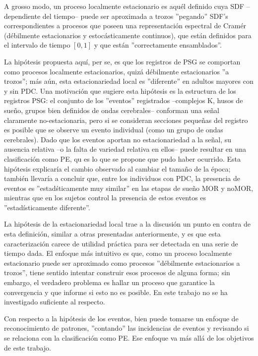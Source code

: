 A grosso modo, un proceso localmente estacionario 
es aqu\'el definido cuya SDF --dependiente del tiempo--
puede ser aproximada a trozos ''pegando'' SDF's correspondientes a procesos que poseen una
representaci\'on espectral de Cram\'er
(d\'ebilmente estacionarios y estoc\'asticamente continuos), que est\'an definidos
para el intervalo de tiempo $[0,1]$ y que est\'an ''correctamente ensamblados''.

La hip\'otesis propuesta aqu\'i, per se, es que los registros de PSG se comportan como procesos
localmente estacionarios, quiz\'a d\'ebilmente estacionarios ''a trozos''; 
m\'as a\'un, esta estacionariedad local es ''diferente'' en
adultos mayores con y sin PDC. 
Una motivaci\'on que sugiere esta hip\'otesis es la estructura de los registros PSG: 
el conjunto de los ''eventos'' registrados
--complejos K, husos de sue\~no, grupos bien definidos de ondas cerebrales--
conforman una se\~nal claramente no-estacionaria, pero si se consideran secciones peque\~nas
del registro es posible que se observe un evento individual (como un grupo de ondas cerebrales).
Dado que los eventos aportan no estacionariedad a la se\~nal, su ausencia relativa --o la falta
de variedad relativa en ellos-- puede resultar en una clasificaci\'on como PE, qu es lo que se
propone que pudo haber ocurrido. 
Esta hip\'otesis explicar\'ia el cambio observado al cambiar el tama\~no de la \'epoca; tambi\'en
llevar\'ia a concluir que, entre los individuos con PDC, la presencia de eventos es
''estad\'sticamente muy similar'' en las etapas de sue\~no MOR y noMOR, 
mientras que en los sujetos control 
la presencia de estos eventos es ''estad\'isticamente diferente''.


La hip\'otesis de la estacionariedad local trae a la discusi\'on
un punto
en contra de esta definici\'on, similar a otras presentadas anteriormente, y
es que esta caracterizaci\'on carece de utilidad pr\'actica para ser detectada
en una serie de tiempo dada. El enfoque m\'as intuitivo es que, como un proceso
localmente estacionario puede ser aproximado como procesos ''d\'ebilmente 
estacionarios a trozos'', tiene sentido intentar construir esos procesos de alguna forma;
sin embargo, el verdadero problema es hallar un proceso que garantice la convergencia
y que informe si esto no es posible. En este trabajo no se ha investigado
suficiente al respecto.

Con respecto a la hip\'otesis de los eventos, bien puede tomarse un enfoque de reconocimiento de
patrones, ''contando'' las incidencias de eventos y revisando si se relaciona con la
clasificaci\'on como PE. Ese enfoque va m\'as all\'a de los objetivos de este trabajo.

